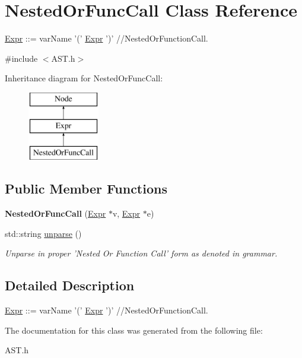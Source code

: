 \hypertarget{classNestedOrFuncCall}{\section{Nested\-Or\-Func\-Call Class Reference}
\label{classNestedOrFuncCall}
}


\hyperlink{classExpr}{Expr} \-:\-:= var\-Name '(' \hyperlink{classExpr}{Expr} ')' //\-Nested\-Or\-Function\-Call.  




{\ttfamily \#include $<$A\-S\-T.\-h$>$}

Inheritance diagram for Nested\-Or\-Func\-Call\-:\begin{figure}[H]
\begin{center}
\leavevmode
\includegraphics[height=3.000000cm]{classNestedOrFuncCall}
\end{center}
\end{figure}
\subsection*{Public Member Functions}
\begin{DoxyCompactItemize}
\item 
\hypertarget{classNestedOrFuncCall_ad6a1ea0a0646a8e9abc04747414287a6}{{\bfseries Nested\-Or\-Func\-Call} (\hyperlink{classExpr}{Expr} $\ast$v, \hyperlink{classExpr}{Expr} $\ast$e)}\label{classNestedOrFuncCall_ad6a1ea0a0646a8e9abc04747414287a6}

\item 
\hypertarget{classNestedOrFuncCall_a6d24500653da39566c63538439742cd3}{std\-::string \hyperlink{classNestedOrFuncCall_a6d24500653da39566c63538439742cd3}{unparse} ()}\label{classNestedOrFuncCall_a6d24500653da39566c63538439742cd3}

\begin{DoxyCompactList}\small\item\em Unparse in proper 'Nested Or Function Call' form as denoted in grammar. \end{DoxyCompactList}\end{DoxyCompactItemize}


\subsection{Detailed Description}
\hyperlink{classExpr}{Expr} \-:\-:= var\-Name '(' \hyperlink{classExpr}{Expr} ')' //\-Nested\-Or\-Function\-Call. 

The documentation for this class was generated from the following file\-:\begin{DoxyCompactItemize}
\item 
A\-S\-T.\-h\end{DoxyCompactItemize}

